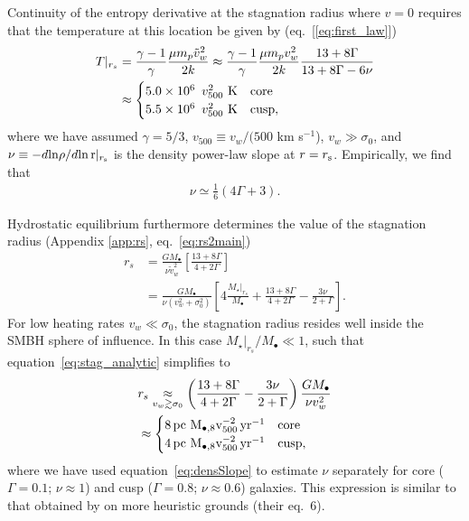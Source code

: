 \documentclass[usenatbib,fleqn]{mn2e}
\newcommand{\rs}{r_s}
\newcommand{\vw}{\tilde{v}_{w}}
\newcommand{\pc}{\rm pc}
\newcommand{\Mstar}{M_{\star}}
\newcommand{\Mbh}[1][]{M_{\bullet#1}}
\newcommand{\Mbheight}{M_{\bullet,8}}
\newcommand{\pyear}{{\rm yr}^{-1}}
\newcommand{\densSlope}{\nu}
\begin{document}
Continuity of the entropy derivative at the stagnation radius where $v = 0$ requires that the temperature at this location be given by (eq.~[\ref{eq:first_law}])
\begin{align}
T|_{r_{s}}& = \frac{\gamma-1}{\gamma}\frac{\mu m_p
  \tilde{v}_{w}^{2}}{2k} \approx \frac{\gamma-1}{\gamma}\frac{\mu
  m_p v_w^2}{2k} \frac{13+8\Gamma}{13+8\Gamma-6\nu} \nonumber\\ 
 &\approx
 \begin{cases}
  5.0\times 10^6\ \, v_{500}^2 \,\,{\rm K} & \text{core} \\
  5.5\times 10^6\ \, v_{500}^2 \,\,{\rm K} & \text{cusp},
 \end{cases}
\label{eq:Tanalytic}
\end{align}
where we have assumed $\gamma=5/3$, $v_{500} \equiv v_{w}/(500$ km
s$^{-1}$), $v_w\gg\sigma_0$,  and $\densSlope \equiv -d{\rm ln}\rho/d{\rm ln\,r}|_{r_{\rm
    s}}$ is the density power-law slope at $r = r_{\rm s}$.
Empirically, we find that
\begin{align}
\densSlope \simeq \frac{1}{6} \left(4 \Gamma+3\right).
\label{eq:densSlope}
\end{align}

Hydrostatic equilibrium furthermore determines the value of the stagnation radius (Appendix \ref{app:rs}, eq.~\ref{eq:rs2main})
\begin{align}
  \rs&=\frac{G \Mbh}{\densSlope \vw^2}\left[\frac{13+ 8\Gamma}{4+2\Gamma}\right]\nonumber\\
  &=\frac{G \Mbh}{\densSlope (v_w^{2}+\sigma_0^2)}\left[4
    \frac{\Mstar|_{\rs}}{\Mbh} +\frac{13+
      8\Gamma}{4+2\Gamma}- \frac{3\nu}{2+\Gamma}\right]. 
\label{eq:stag_analytic}
\end{align}
For low heating rates $v_w \ll \sigma_0$, the stagnation radius resides well inside the SMBH sphere of influence.  In this case $\Mstar|_{\rs}/\Mbh \ll1$, such that equation~\eqref{eq:stag_analytic} simplifies to
\begin{align}
  &\rs \underset{v_w \gtrsim \sigma_0}\approx
  \left(\frac{13+8\Gamma}{4+2\Gamma}-
    \frac{3\nu}{2+\Gamma}\right)\frac{G \Mbh}{\nu v_w^2}\nonumber\\
  &\approx \begin{cases} 8
    \, \pc \,\, \Mbheight v_{500}^{-2}\, \pyear& \text{core} \\
    4 \, \pc \,\, \Mbheight v_{500}^{-2} \, \pyear & \text{cusp},
  \end{cases}
  \label{eq:stag_simple}
\end{align}
where we have used equation~\eqref{eq:densSlope} to estimate
$\densSlope$ separately for
core ($\Gamma = 0.1$; $\densSlope\approx 1$) and cusp ($\Gamma = 0.8$; $\densSlope \approx 0.6$) galaxies.  This
expression is similar to that obtained by \citet{Volonteri+11} on more
heuristic grounds (their eq.~6). 
\end{document}
